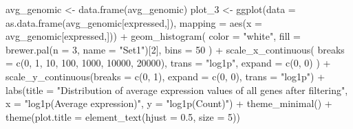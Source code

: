 \documentclass[
  letterpaper,
  DIV=11,
  numbers=noendperiod]{scrartcl}
\newenvironment{Shaded}{\begin{snugshade}}{\end{snugshade}}
\newcommand{\AttributeTok}[1]{\textcolor[rgb]{0.40,0.45,0.13}{#1}}
\newcommand{\DecValTok}[1]{\textcolor[rgb]{0.68,0.00,0.00}{#1}}
\newcommand{\FloatTok}[1]{\textcolor[rgb]{0.68,0.00,0.00}{#1}}
\newcommand{\FunctionTok}[1]{\textcolor[rgb]{0.28,0.35,0.67}{#1}}
\newcommand{\NormalTok}[1]{\textcolor[rgb]{0.00,0.23,0.31}{#1}}
\newcommand{\OtherTok}[1]{\textcolor[rgb]{0.00,0.23,0.31}{#1}}
\newcommand{\SpecialCharTok}[1]{\textcolor[rgb]{0.37,0.37,0.37}{#1}}
\newcommand{\StringTok}[1]{\textcolor[rgb]{0.13,0.47,0.30}{#1}}
\begin{document}
\begin{Shaded}
\begin{Highlighting}[]
\NormalTok{avg\_genomic }\OtherTok{\textless{}{-}} \FunctionTok{data.frame}\NormalTok{(avg\_genomic)}
\NormalTok{plot\_3 }\OtherTok{\textless{}{-}} \FunctionTok{ggplot}\NormalTok{(}\AttributeTok{data =} \FunctionTok{as.data.frame}\NormalTok{(avg\_genomic[expressed,]), }\AttributeTok{mapping =}  \FunctionTok{aes}\NormalTok{(}\AttributeTok{x =}\NormalTok{ avg\_genomic[expressed,])) }\SpecialCharTok{+}
  \FunctionTok{geom\_histogram}\NormalTok{(}
    \AttributeTok{color =} \StringTok{"white"}\NormalTok{,}
    \AttributeTok{fill =} \FunctionTok{brewer.pal}\NormalTok{(}\AttributeTok{n =} \DecValTok{3}\NormalTok{, }\AttributeTok{name =} \StringTok{"Set1"}\NormalTok{)[}\DecValTok{2}\NormalTok{],}
    \AttributeTok{bins =} \DecValTok{50}
\NormalTok{  ) }\SpecialCharTok{+}
  \FunctionTok{scale\_x\_continuous}\NormalTok{(}
    \AttributeTok{breaks =} \FunctionTok{c}\NormalTok{(}\DecValTok{0}\NormalTok{, }\DecValTok{1}\NormalTok{, }\DecValTok{10}\NormalTok{, }\DecValTok{100}\NormalTok{, }\DecValTok{1000}\NormalTok{, }\DecValTok{10000}\NormalTok{, }\DecValTok{20000}\NormalTok{),}
    \AttributeTok{trans =} \StringTok{"log1p"}\NormalTok{,}
    \AttributeTok{expand =} \FunctionTok{c}\NormalTok{(}\DecValTok{0}\NormalTok{, }\DecValTok{0}\NormalTok{)}
\NormalTok{  ) }\SpecialCharTok{+}
  \FunctionTok{scale\_y\_continuous}\NormalTok{(}\AttributeTok{breaks =} \FunctionTok{c}\NormalTok{(}\DecValTok{0}\NormalTok{, }\DecValTok{1}\NormalTok{),}
                     \AttributeTok{expand =} \FunctionTok{c}\NormalTok{(}\DecValTok{0}\NormalTok{, }\DecValTok{0}\NormalTok{),}
                     \AttributeTok{trans =} \StringTok{"log1p"}\NormalTok{) }\SpecialCharTok{+}
  \FunctionTok{labs}\NormalTok{(}\AttributeTok{title =} \StringTok{"Distribution of average expression values of all genes after filtering"}\NormalTok{,}
       \AttributeTok{x =} \StringTok{"log1p(Average expression)"}\NormalTok{,}
       \AttributeTok{y =} \StringTok{"log1p(Count)"}\NormalTok{) }\SpecialCharTok{+}
  \FunctionTok{theme\_minimal}\NormalTok{() }\SpecialCharTok{+}
  \FunctionTok{theme}\NormalTok{(}\AttributeTok{plot.title =} \FunctionTok{element\_text}\NormalTok{(}\AttributeTok{hjust =} \FloatTok{0.5}\NormalTok{,  }\AttributeTok{size =} \DecValTok{5}\NormalTok{))}


\end{Highlighting}
\end{Shaded}
\end{document}
